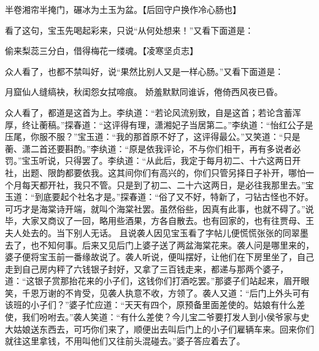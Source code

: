 \documentclass[12pt,oneside]{book}
\begin{document}
半卷湘帘半掩门，碾冰为土玉为盆。【后回守户换作冷心肠也】

看了这句，宝玉先喝起彩来，只说“从何处想来！”又看下面道是：

偷来梨蕊三分白，借得梅花一缕魂。【凌寒坚贞志】

众人看了，也都不禁叫好，说“果然比别人又是一样心肠。”又看下面道是：

月窟仙人缝缟袂，秋闺怨女拭啼痕。
娇羞默默同谁诉，倦倚西风夜已昏。

众人看了，都道是这首为上。李纨道：“若论风流别致，自是这首；若论含蓄浑厚，终让蘅稿。”探春道：“这评得有理，潇湘妃子当居第二。”李纨道：“怡红公子是压尾，你服不服？”宝玉道：“我的那首原不好了，这评得最公。”又笑道：“只是蘅、潇二首还要斟酌。”李纨道：“原是依我评论，不与你们相干，再有多说者必罚。”宝玉听说，只得罢了。李纨道：“从此后，我定于每月初二、十六这两日开社，出题、限韵都要依我。这其间你们有高兴的，你们只管另择日子补开，哪怕一个月每天都开社，我只不管。只是到了初二、二十六这两日，是必往我那里去。”宝玉道：“到底要起个社名才是。”探春道：“俗了又不好，特新了，刁钻古怪也不好。可巧才是海棠诗开端，就叫个海棠社罢。虽然俗些，因真有此事，也就不碍了。”说毕，大家又商议了一回，略用些酒果，方各自散去。也有回家的，也有往贾母、王夫人处去的。当下别人无话。
且说袭人因见宝玉看了字帖儿便慌慌张张的同翠墨去了，也不知何事。后来又见后门上婆子送了两盆海棠花来。袭人问是哪里来的，婆子便将宝玉前一番缘故说了。袭人听说，便叫摆好，让他们在下房里坐了，自己走到自己房内秤了六钱银子封好，又拿了三百钱走来，都递与那两个婆子，道：“这银子赏那抬花来的小子们，这钱你们打酒吃罢。”那婆子们站起来，眉开眼笑，千恩万谢的不肯受，见袭人执意不收，方领了。袭人又道：“后门上外头可有该班的小子们？”婆子忙应道：“天天有四个，原预备里面差使的。姑娘有什么差使，我们吩咐去。”袭人笑道：“有什么差使？今儿宝二爷要打发人到小侯爷家与史大姑娘送东西去，可巧你们来了，顺便出去叫后门上的小子们雇辆车来。回来你们就往这里拿钱，不用叫他们又往前头混碰去。”婆子答应着去了。
\end{document}
